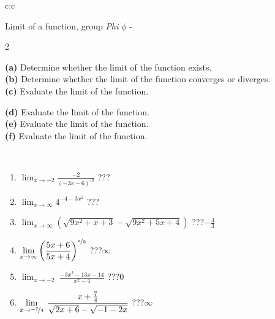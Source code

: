 \documentclass[10pt]{report}
\begin{document}
\newpage
\thispagestyle{empty}
\begin{tabular}{c:c}
\begin{minipage}[c][104.5mm][t]{0.5\linewidth}
\begin{center}
\vspace{5mm}
{\huge Limit of a function, group \textit{Phi $\phi$} -}\\[5mm]
\begin{minipage}{0.95\linewidth}
\begin{center}
{\small \begin{multicols}{2} \raggedright
\textbf{(a)} Determine whether the limit of the function exists. \\[1mm]
\textbf{(b)} Determine whether the limit of the function converges or diverges. \\[1mm]
\textbf{(c)} Evaluate the limit of the function. \par \columnbreak
\textbf{(d)} Evaluate the limit of the function. \\[1mm]
\textbf{(e)} Evaluate the limit of the function. \\[1mm]
\textbf{(f)} Evaluate the limit of the function. \\[1mm]
\end{multicols}
}
\end{center}
\end{minipage}
\\[1mm]
\begin{minipage}{0.79\linewidth}
\begin{center}
\begin{varwidth}{\linewidth}
\setlength{\itemsep}{0pt}
\begin{enumerate}
\normalsize
\item $\displaystyle\lim_{x\to-2}{\frac{-2}{(-3x-6)^{10}}}$\quad \dotfill\; ???\;\dotfill \quad {}
\item $\displaystyle\lim_{x\to\infty}{4^{-4-3x^2}}$\quad \dotfill\; ???\;\dotfill \quad {}
\item $\displaystyle\lim_{x\to\infty}{\left(\sqrt{9x^2+x+3} - \sqrt{9x^2+5x+4}\right)}$\quad \dotfill\; ???\;\dotfill \quad $-\frac{4}{3}$
\item $\displaystyle\lim_{x\to\infty}{\left( \frac{5x+6}{5x+4} \right)^{\nicefrac{x}{5}}}$\quad \dotfill\; ???\;\dotfill \quad $\infty$
\item $\displaystyle\lim_{x\to -2}{\;\frac{-3x^2-13x-14}{x^2-4}}$\quad \dotfill\; ???\;\dotfill \quad $0$
\item $\displaystyle\lim_{x\to \nicefrac{-7}{4}}{\;\frac{x+\frac{7}{4}}{\sqrt{2x+6} - \sqrt{-1-2x}}}$\quad \dotfill\; ???\;\dotfill \quad $\infty$

\end{enumerate}
\end{varwidth}
\end{center}
\end{minipage}
\end{center}
\end{minipage}
\end{tabular}
\end{document}
